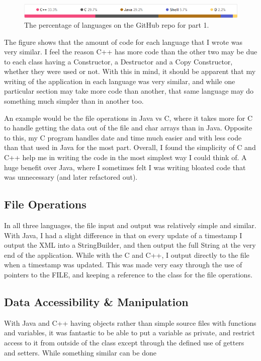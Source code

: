\documentclass{article}
\begin{document}
\begin{figure}[h!]
  \caption{The percentage of languages on the GitHub repo for part 1.}
  \centering
    \includegraphics[width=1\textwidth]{img/percentages}
\end{figure}

The figure shows that the amount of code for each language that I wrote was very similar. I feel the reason C++ has more code than the other two may be due to each class having a Constructor, a Destructor and a Copy Constructor, whether they were used or not. With this in mind, it should be apparent that my writing of the application in each language was very similar, and while one particular section may take more code than another, that same language may do something much simpler than in another too.

An example would be the file operations in Java vs C, where it takes more for C to handle getting the data out of the file and char arrays than in Java. Opposite to this, my C program handles date and time much easier and with less code than that used in Java for the most part. Overall, I found the simplicity of C and C++ help me in writing the code in the most simplest way I could think of. A huge benefit over Java, where I sometimes felt I was writing bloated code that was unnecessary (and later refactored out).

\subsection{File Operations}

In all three languages, the file input and output was relatively simple and similar. With Java, I had a slight difference in that on every update of a timestamp I output the XML into a StringBuilder, and then output the full String at the very end of the application. While with the C and C++, I output directly to the file when a timestamp was updated. This was made very easy through the use of pointers to the FILE, and keeping a reference to the class for the file operations.

\subsection{Data Accessibility \& Manipulation}

With Java and C++ having objects rather than simple source files with functions and variables, it was fantastic to be able to put a variable as private, and restrict access to it from outside of the class except through the defined use of getters and setters. While something similar can be done
\end{document}
